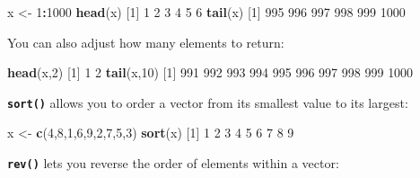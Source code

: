 \documentclass[
]{book}
\newenvironment{Shaded}{\begin{snugshade}}{\end{snugshade}}
\newcommand{\DecValTok}[1]{\textcolor[rgb]{0.00,0.00,0.81}{#1}}
\newcommand{\KeywordTok}[1]{\textcolor[rgb]{0.13,0.29,0.53}{\textbf{#1}}}
\newcommand{\NormalTok}[1]{#1}
\newcommand{\OperatorTok}[1]{\textcolor[rgb]{0.81,0.36,0.00}{\textbf{#1}}}
\newcommand{\StringTok}[1]{\textcolor[rgb]{0.31,0.60,0.02}{#1}}
\begin{document}
\begin{Shaded}
\begin{Highlighting}[]
\NormalTok{x <-}\StringTok{ }\DecValTok{1}\OperatorTok{:}\DecValTok{1000}
\KeywordTok{head}\NormalTok{(x)}
\NormalTok{[}\DecValTok{1}\NormalTok{] }\DecValTok{1} \DecValTok{2} \DecValTok{3} \DecValTok{4} \DecValTok{5} \DecValTok{6}
\KeywordTok{tail}\NormalTok{(x)}
\NormalTok{[}\DecValTok{1}\NormalTok{]  }\DecValTok{995}  \DecValTok{996}  \DecValTok{997}  \DecValTok{998}  \DecValTok{999} \DecValTok{1000}
\end{Highlighting}
\end{Shaded}

You can also adjust how many elements to return:

\begin{Shaded}
\begin{Highlighting}[]
\KeywordTok{head}\NormalTok{(x,}\DecValTok{2}\NormalTok{)}
\NormalTok{[}\DecValTok{1}\NormalTok{] }\DecValTok{1} \DecValTok{2}
\KeywordTok{tail}\NormalTok{(x,}\DecValTok{10}\NormalTok{)}
\NormalTok{ [}\DecValTok{1}\NormalTok{]  }\DecValTok{991}  \DecValTok{992}  \DecValTok{993}  \DecValTok{994}  \DecValTok{995}  \DecValTok{996}  \DecValTok{997}  \DecValTok{998}  \DecValTok{999} \DecValTok{1000}
\end{Highlighting}
\end{Shaded}

\textbf{\texttt{sort()}} allows you to order a vector from its smallest value to its largest:

\begin{Shaded}
\begin{Highlighting}[]
\NormalTok{x <-}\StringTok{ }\KeywordTok{c}\NormalTok{(}\DecValTok{4}\NormalTok{,}\DecValTok{8}\NormalTok{,}\DecValTok{1}\NormalTok{,}\DecValTok{6}\NormalTok{,}\DecValTok{9}\NormalTok{,}\DecValTok{2}\NormalTok{,}\DecValTok{7}\NormalTok{,}\DecValTok{5}\NormalTok{,}\DecValTok{3}\NormalTok{)}
\KeywordTok{sort}\NormalTok{(x)}
\NormalTok{[}\DecValTok{1}\NormalTok{] }\DecValTok{1} \DecValTok{2} \DecValTok{3} \DecValTok{4} \DecValTok{5} \DecValTok{6} \DecValTok{7} \DecValTok{8} \DecValTok{9}
\end{Highlighting}
\end{Shaded}

\textbf{\texttt{rev()}} lets you reverse the order of elements within a vector:
\end{document}
